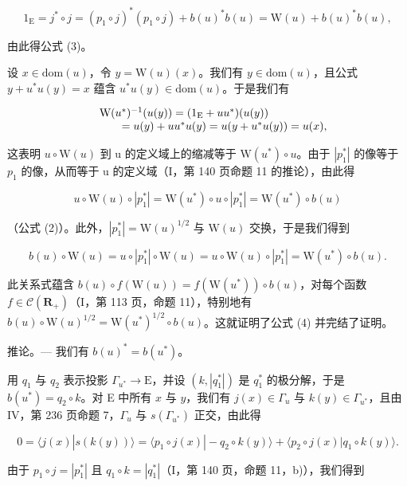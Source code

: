 \[
1 _ {\mathrm{E}} = j ^ {*} \circ j = (p _ {1} \circ j) ^ {*} (p _ {1} \circ j) + b (u) ^ {*} b (u) = \mathrm{W} (u) + b (u) ^ {*} b (u),
\]

由此得公式 (3)。

设 \(x \in \mathrm{dom}(u)\)，令 \(y = \mathrm{W}(u)(x)\)。我们有 \(y \in \mathrm{dom}(u)\)，且公式 \(y + u^{*}u(y) = x\) 蕴含 \(u^{*}u(y) \in \mathrm{dom}(u)\)。于是我们有

\[
\begin{array}{r l} & {\mathrm{W} (u ^ {*}) ^ {- 1} (u (y)) = (1 _ {\mathrm{E}} + u u ^ {*}) (u (y))} \\ & {\qquad = u (y) + u u ^ {*} u (y) = u (y + u ^ {*} u (y)) = u (x),} \end{array}
\]

这表明 \(u \circ \mathrm{W}(u)\) 到 u 的定义域上的缩减等于 \(\mathrm{W}(u^{*}) \circ u\)。由于 \(|p_{1}^{*}|\) 的像等于 \(p_{1}\) 的像，从而等于 u 的定义域（I，第 140 页命题 11 的推论），由此得

\[
u \circ \mathrm{W} (u) \circ | p _ {1} ^ {*} | = \mathrm{W} (u ^ {*}) \circ u \circ | p _ {1} ^ {*} | = \mathrm{W} (u ^ {*}) \circ b (u)
\]

（公式 (2)）。此外，\(|p_{1}^{*}| = \mathrm{W}(u)^{1/2}\) 与 \(\mathrm{W}(u)\) 交换，于是我们得到

\[
b (u) \circ \mathrm{W} (u) = u \circ | p _ {1} ^ {*} | \circ \mathrm{W} (u) = u \circ \mathrm{W} (u) \circ | p _ {1} ^ {*} | = \mathrm{W} (u ^ {*}) \circ b (u).
\]

此关系式蕴含 \(b(u) \circ f(\mathrm{W}(u)) = f(\mathrm{W}(u^{*})) \circ b(u)\)，对每个函数 \(f \in \mathcal{C}(\mathbf{R}_{+})\)（I，第 113 页，命题 11），特别地有 \(b(u) \circ \mathrm{W}(u)^{1/2} = \mathrm{W}(u^{*})^{1/2} \circ b(u)\)。这就证明了公式 (4) 并完结了证明。

推论。--- 我们有 \(b(u)^{*} = b(u^{*})\)。

用 \(q_{1}\) 与 \(q_{2}\) 表示投影 \(\Gamma_{u^{*}}\to\mathrm{E}\)，并设 \((k,|q_{1}^{*}|)\) 是 \(q_{1}^{*}\) 的极分解，于是 \(b(u^{*})=q_{2}\circ k\)。对 E 中所有 \(x\) 与 \(y\)，我们有 \(j(x)\in\Gamma_{u}\) 与 \(k(y)\in\Gamma_{u^{*}}\)，且由 IV，第 236 页命题 7，\(\Gamma_{u}\) 与 \(s(\Gamma_{u^{*}})\) 正交，由此得

\[
0 = \langle j (x) | s (k (y)) \rangle = \langle p _ {1} \circ j (x) | - q _ {2} \circ k (y) \rangle + \langle p _ {2} \circ j (x) | q _ {1} \circ k (y) \rangle .
\]

由于 \(p_1 \circ j = |p_1^*|\) 且 \(q_1 \circ k = |q_1^*|\)（I，第 140 页，命题 11，b)），我们得到

